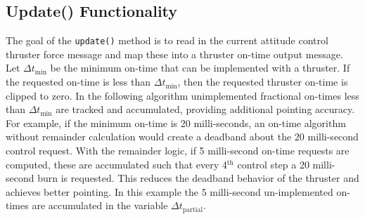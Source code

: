 \subsection{Update() Functionality}
The goal of the {\tt update()} method is to read in the current attitude control thruster force message and map these into a thruster on-time output message.  Let $\Delta t_{\text{min}}$ be the minimum on-time that can be implemented with a thruster.  If the requested on-time is less than $\Delta t_{\text{min}}$, then the requested thruster on-time is clipped to zero.  In the following algorithm unimplemented fractional on-times less than $\Delta t_{\text{min}}$ are tracked and accumulated, providing additional pointing accuracy.  For example, if the minimum on-time is 20 milli-seconds, an on-time algorithm without remainder calculation would create a deadband about the 20 milli-second control request.  With the remainder logic, if 5 milli-second on-time requests are computed, these are accumulated such that every 4$^{\text{th}}$ control step a 20 milli-second burn is requested.  This reduces the deadband behavior of the thruster and achieves better pointing.  In this example the 5 milli-second un-implemented on-times are accumulated in the variable $\Delta t_{\text{partial}}$.  

